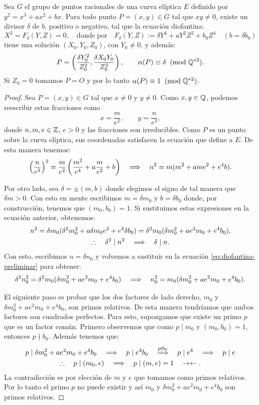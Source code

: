 \begin{lema}\label{lema:imagen-alpha}%
	Sea $G$ el grupo de puntos racionales de una curva elíptica $E$ definido por $y^2=x^3+ax^2+bx$. Para todo punto $P=(x,y)\in G$ tal que $xy\neq0$, existe un divisor $\delta$ de $b$, positivo o negativo, tal que la ecuación diofantina:
	\[
		X^2=F_\delta(Y,Z)=0,\quad\mathrm{donde}\;\mathrm{por}\quad
		F_\delta(Y,Z):=\delta Y^4+aY^2Z^2+b_0Z^4\quad(b=\delta b_0)
	\]
	tiene una solución $(X_0,Y_0,Z_0)$, con $Y_0\neq0$, y además:
	\[
		P=\left(\frac{\delta Y_0^2}{Z_0^2},\frac{\delta X_0 Y_0}{Z_0^3} \right),\qquad \alpha(P)\equiv\delta\;\;(\mathrm{mod}\; \mathbb{Q}^{*2}).
	\]
	Si $Z_0=0$ tomamos $P=O$ y por lo tanto $\alpha(P)\equiv 1 \;\;(\mathrm{mod}\; \mathbb{Q}^{*2})$.
\end{lema}
\begin{proof}
	Sea $P=(x,y)\in G$ tal que $x\neq0$ y $y\neq0$. Como $x,y\in\mathbb{Q}$, podemos reescribir estas fracciones como
	\[
		x=\frac{m}{e^2},\qquad y=\frac{n}{e^3},
	\]
	donde $n,m,e\in\mathbb{Z}$, $e>0$ y las fracciones son irreducibles. Como $P$ es un punto sobre la curva elíptica, sus coordenadas satisfacen la ecuación que define a $E$. De esta manera tenemos:
	\[
		\left( \frac{n}{e^3} \right)^2=\frac{m}{e^2}\left(\frac{m^2}{e^4}+a\frac{m}{e^2}+b\right) \quad\Longrightarrow\quad n^2=m(m^2+ame^2+e^4b).
	\]
	
	Por otro lado, sea $\delta=\pm(m,b)$ donde elegimos el signo de tal manera que $\delta m>0$. Con esto en mente escribimos $m=\delta m_0$ y $b=\delta b_0$ donde, por construcción, tenemos que $(m_0,b_0)=1$. Si sustituimos estas expresiones en la ecuación anterior, obtenemos:
	\begin{gather}
		n^2=\delta m_0(\delta^2m_0^2+a\delta m_0 e^2+e^4\delta b_0)=\delta^2m_0(\delta m_0^2+ae^2m_0+e^4b_0),\label{eq:diofantina-preliminar}\\
		\therefore\quad\delta^2\mid n^2\quad\Longrightarrow\quad \delta\mid n.\nonumber
	\end{gather}
Con esto, escribimos $n=\delta n_0$ y volvemos a sustituir en la ecuación \eqref{eq:diofantina-preliminar} para obtener:
	\begin{equation}\label{eq:diofantina-preliminar-2}
		\delta^2n_0^2=\delta^2m_0(\delta m_0^2+ae^2m_0+e^4b_0) \quad\Longrightarrow\quad n_0^2=m_0(\delta m_0^2+ae^2m_0+e^4b_0).
	\end{equation}
		
	El siguiente paso es probar que los dos factores de lado derecho, $m_0$ y $\delta m_0^2+ae^2m_0+e^4b_0$, son primos relativos. De esta manera tendríamos que ambos factores son cuadrados perfectos. Para esto, supongamos que existe un primo $p$ que es un factor común. Primero observemos que como $p\mid m_0$ y $(m_0,b_0)=1$, entonces $p\nmid b_0$. Además tenemos que:
	\begin{gather*}
		p\mid \delta m_0^2+ae^2m_0+e^4b_0 \quad\Longrightarrow\quad p\mid e^4b_0 \quad\overset{p\nmid b_0}{\Longrightarrow}\quad p\mid e^4 \quad\Longrightarrow\quad p\mid e\\
		\therefore\quad p\mid(m_0,e) \quad\Longrightarrow\quad p\mid (m,e)=1 \quad\rightarrow\leftarrow.
	\end{gather*}
La contradicción es por elección de $m$ y $e$ que tomamos como primos relativos. Por lo tanto el primo $p$ no puede existir y así $m_0$ y $\delta m_0^2+ae^2m_0+e^4b_0$ son primos relativos.


\end{proof}
